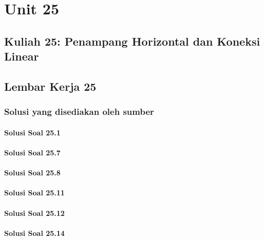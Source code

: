 \documentclass[11pt,a4paper,oneside]{book}
\begin{document}
\part{Unit 25}
\chapter[Kuliah 25]{Kuliah 25: Penampang Horizontal dan Koneksi Linear}


\chapter{Lembar Kerja 25}


\section*{Solusi yang disediakan oleh sumber}
\subsection*{Solusi Soal 25.1}

\subsection*{Solusi Soal 25.7}

\subsection*{Solusi Soal 25.8}

\subsection*{Solusi Soal 25.11}

\subsection*{Solusi Soal 25.12}

\subsection*{Solusi Soal 25.14}

\end{document}
